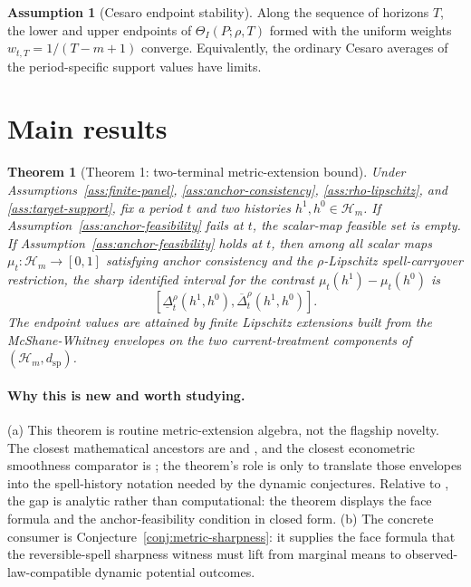 \documentclass[11pt]{article}
\newcommand{\calH}{\mathcal{H}}
\theoremstyle{definition}
\newtheorem{assumption}{Assumption}
\theoremstyle{plain}
\newtheorem{theorem}{Theorem}
\theoremstyle{remark}
\begin{document}
\begin{assumption}[Cesaro endpoint stability]\label{ass:cesaro-stability}
Along the sequence of horizons \(T\), the lower and upper endpoints of \(\Theta_I(P;\rho,T)\) formed with the uniform weights \(w_{t,T}=1/(T-m+1)\) converge.  Equivalently, the ordinary Cesaro averages of the period-specific support values have limits.
\end{assumption}

\section{Main results}
\begin{theorem}[Theorem 1: two-terminal metric-extension bound]\label{thm:two-terminal}
Under Assumptions~\ref{ass:finite-panel}, \ref{ass:anchor-consistency}, \ref{ass:rho-lipschitz}, and \ref{ass:target-support}, fix a period \(t\) and two histories \(h^1,h^0\in\calH_m\).  If Assumption~\ref{ass:anchor-feasibility} fails at \(t\), the scalar-map feasible set is empty.  If Assumption~\ref{ass:anchor-feasibility} holds at \(t\), then among all scalar maps \(\mu_t:\calH_m\to[0,1]\) satisfying anchor consistency and the \(\rho\)-Lipschitz spell-carryover restriction, the sharp identified interval for the contrast \(\mu_t(h^1)-\mu_t(h^0)\) is
\[
  [\underline\Delta_t^\rho(h^1,h^0),\overline\Delta_t^\rho(h^1,h^0)].
\]
The endpoint values are attained by finite Lipschitz extensions built from the McShane-Whitney envelopes on the two current-treatment components of \((\calH_m,d_{\mathrm{sp}})\).
\end{theorem}
\paragraph{Why this is new and worth studying.}
(a) This theorem is routine metric-extension algebra, not the flagship novelty.  The closest mathematical ancestors are \citet{McShane1934} and \citet{Whitney1934}, and the closest econometric smoothness comparator is \citet{KimKwonKwonLee2018}; the theorem's role is only to translate those envelopes into the spell-history notation needed by the dynamic conjectures.  Relative to \citet{DuarteFinkelsteinKnoxMummoloShpitser2024}, the gap is analytic rather than computational: the theorem displays the face formula and the anchor-feasibility condition in closed form.  (b) The concrete consumer is Conjecture~\ref{conj:metric-sharpness}: it supplies the face formula that the reversible-spell sharpness witness must lift from marginal means to observed-law-compatible dynamic potential outcomes.
\end{document}
